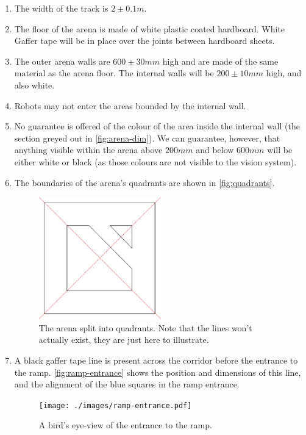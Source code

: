 \begin{enumerate}
\item The width of the track is $2\pm0.1m$.
\item The floor of the arena is made of white plastic coated hardboard.
 White Gaffer tape will be in place over the joints between hardboard sheets.
\item The outer arena walls are $600\pm30mm$ high and are made of the same material as the arena floor.
 The internal walls will be $200\pm10mm$ high, and also white.
\item Robots may not enter the areas bounded by the internal wall.
\item No guarantee is offered of the colour of the area inside the internal wall (the section greyed out in \autoref{fig:arena-dim}).
 We can guarantee, however, that anything visible within the arena above $200mm$ and below $600mm$ will be either white or black (as those colours are not visible to the vision system).
\item The boundaries of the arena's quadrants are shown in \autoref{fig:quadrants}.

\begin{figure}
\begin{center}
  \includegraphics[keepaspectratio, clip, width=0.5\textwidth]{./images/quadrants.pdf}
  \caption{\label{fig:quadrants}The arena split into quadrants.
           Note that the lines won't actually exist, they are just here to illustrate.}
\end{center}
\end{figure}

\item A black gaffer tape line is present across the corridor before the entrance to the ramp.  \autoref{fig:ramp-entrance} shows the position and dimensions of this line, and the alignment of the blue squares in the ramp entrance.

  \begin{figure}
    \begin{center}
    \texttt{[image: ./images/ramp-entrance.pdf]}
    \end{center}
    \caption{\label{fig:ramp-entrance}A bird's eye-view of the entrance to the ramp.}
  \end{figure}


\end{enumerate}

